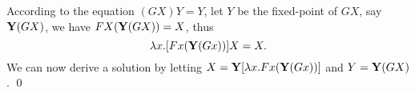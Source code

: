 \begin{pf} \rm
 According to the equation $(GX)Y=Y$, let $Y$ be the fixed-point of $GX$, say $\mathbf{Y}(GX)$,
 we have $FX(\mathbf{Y}(GX))=X$, thus
  \[\lambda x.[Fx (\mathbf{Y}(Gx)) ] X = X.\]
 We can now derive a solution by letting $X=\mathbf{Y} [\lambda x.Fx (\mathbf{Y}(Gx)) ]$ and $Y=\mathbf{Y}(GX)$.
 \qed
\end{pf}
